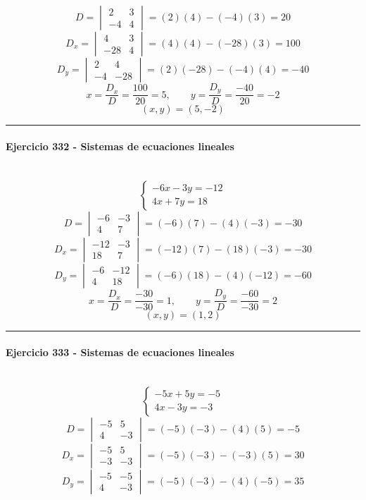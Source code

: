 \documentclass[10pt,a4paper]{article}
\newcommand{\res}[1]{\paragraph{#1}\mbox{}\\[-1.2em]}
\begin{document}
\[ D=\begin{vmatrix}2&3\\-4&4\end{vmatrix}=(2)(4)-(-4)(3)=20 \]
\[ D_x=\begin{vmatrix}4&3\\-28&4\end{vmatrix}=(4)(4)-(-28)(3)=100 \]
\[ D_y=\begin{vmatrix}2&4\\-4&-28\end{vmatrix}=(2)(-28)-(-4)(4)=-40 \]
\[ x=\frac{D_x}{D}=\frac{100}{20}=5,\qquad y=\frac{D_y}{D}=\frac{-40}{20}=-2 \]
\[ \boxed{(x,y)=(5,-2)} \]
\vspace{1mm}\hrule\vspace{2mm}
\res{Ejercicio 332 - Sistemas de ecuaciones lineales}
\[ \begin{cases}- 6 x - 3 y=-12\\4 x + 7 y=18\end{cases} \]
\[ D=\begin{vmatrix}-6&-3\\4&7\end{vmatrix}=(-6)(7)-(4)(-3)=-30 \]
\[ D_x=\begin{vmatrix}-12&-3\\18&7\end{vmatrix}=(-12)(7)-(18)(-3)=-30 \]
\[ D_y=\begin{vmatrix}-6&-12\\4&18\end{vmatrix}=(-6)(18)-(4)(-12)=-60 \]
\[ x=\frac{D_x}{D}=\frac{-30}{-30}=1,\qquad y=\frac{D_y}{D}=\frac{-60}{-30}=2 \]
\[ \boxed{(x,y)=(1,2)} \]
\vspace{1mm}\hrule\vspace{2mm}
\res{Ejercicio 333 - Sistemas de ecuaciones lineales}
\[ \begin{cases}- 5 x + 5 y=-5\\4 x - 3 y=-3\end{cases} \]
\[ D=\begin{vmatrix}-5&5\\4&-3\end{vmatrix}=(-5)(-3)-(4)(5)=-5 \]
\[ D_x=\begin{vmatrix}-5&5\\-3&-3\end{vmatrix}=(-5)(-3)-(-3)(5)=30 \]
\[ D_y=\begin{vmatrix}-5&-5\\4&-3\end{vmatrix}=(-5)(-3)-(4)(-5)=35 \]
\end{document}
